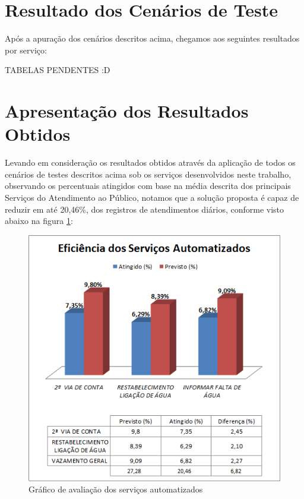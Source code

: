 \section{Resultado dos Cenários de Teste}

Após a apuração dos cenários descritos acima, chegamos aos seguintes resultados por serviço:

\begin{center}
	TABELAS PENDENTES :D		
\end{center}


\section{Apresentação dos Resultados Obtidos}

Levando em consideração os resultados obtidos através da aplicação de todos os cenários de testes descritos acima sob os serviços desenvolvidos neste trabalho, observando os percentuais atingidos com base na média descrita dos principais Serviços do Atendimento ao Público, notamos que a solução proposta é capaz de reduzir em até 20,46\%, dos registros de atendimentos diários, conforme visto abaixo na figura \ref{figura:eficienciaServicos}:	


\begin{figure}[!htb]
	\centering
	\caption{Gráfico de avaliação dos serviços automatizados}
	\label{figura:eficienciaServicos}	
	\includegraphics{figuras/eficiencia_servicos.png}
\end{figure}

